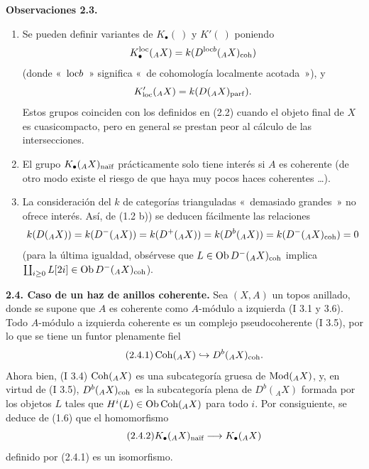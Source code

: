 \textbf{Observaciones 2.3.}
\begin{enumerate}[label=\alph*)]
\item Se pueden definir variantes de \(K_\bullet(\ )\) y \(K'(\ )\) poniendo
\[
 K_\bullet^{\loc}({}_A X)=k(D^{\loc b}({}_A X)_{\coh})
\]
(donde «~\(\loc b\)~» significa «~de cohomología localmente acotada~»), y
\[
 K_{\loc}'({}_A X)=k(D({}_A X)_{\parf}).
\]
Estos grupos coinciden con los definidos en (2.2) cuando el objeto final de \(X\) es cuasicompacto, pero en general se prestan peor al cálculo de las intersecciones.
\item El grupo \(K_\bullet({}_A X)_{\naif}\) prácticamente solo tiene interés si \(A\) es coherente (de otro modo existe el riesgo de que haya muy pocos haces coherentes \ldots).
\item La consideración del \(k\) de categorías trianguladas «~demasiado grandes~» no ofrece interés. Así, de (1.2 b)) se deducen fácilmente las relaciones
\[
 k(D({}_A X))=k(D^-({}_A X))=k(D^+({}_A X))=k(D^b({}_A X))=k(D^-({}_A X)_{\coh})=0
\]
(para la última igualdad, obsérvese que \(L\in\Ob D^-({}_A X)_{\coh}\) implica \(\coprod_{i\geq0}L[2i]\in\Ob D^-({}_A X)_{\coh}\)).
\end{enumerate}

\textbf{2.4. Caso de un haz de anillos coherente.} Sea \((X,A)\) un topos anillado, donde se supone que \(A\) es coherente como \(A\)-módulo a izquierda (I 3.1 y 3.6). Todo \(A\)-módulo a izquierda coherente es un complejo pseudocoherente (I 3.5), por lo que se tiene un funtor plenamente fiel
\begin{equation}\tag{2.4.1}
 \Coh({}_A X)\hookrightarrow D^b({}_A X)_{\coh}.
\end{equation}
Ahora bien, (I 3.4) \(\Coh({}_A X)\) es una subcategoría gruesa de \(\Mod({}_A X)\), y, en virtud de (I 3.5), \(D^b({}_A X)_{\coh}\) es la subcategoría plena de \(D^b({}_A X)\) formada por los objetos \(L\) tales que \(H^i(L)\in\Ob\Coh({}_A X)\) para todo \(i\). Por consiguiente, se deduce de (1.6) que el homomorfismo
\begin{equation}\tag{2.4.2}
 K_\bullet({}_A X)_{\naif}\longrightarrow K_\bullet({}_A X)
\end{equation}
definido por (2.4.1) es un isomorfismo.

